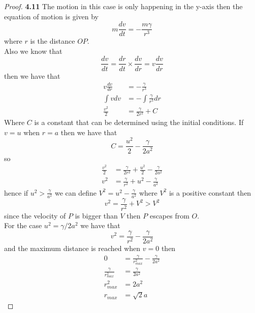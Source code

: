 \documentclass[11pt]{article}
\theoremstyle{definition}
\begin{document}
    \begin{proof}{\textbf{4.11}}
        The motion in this case is only happening in the y-axis then the
        equation of motion is given by 
        $$m \frac{dv}{dt} = -\frac{m\gamma}{r^3}$$
        where $r$ is the distance $OP$.\\
        Also we know that
        $$\frac{dv}{dt} = \frac{dr}{dt}\times\frac{dv}{dr} = v\frac{dv}{dr}$$
        then we have that
        \begin{align*}
            v\frac{dv}{dr} &= -\frac{\gamma}{r^3}\\
            \int vdv &= -\int \frac{\gamma}{r^3}dr\\
            \frac{v^2}{2} &= \frac{\gamma}{2r^2} + C
        \end{align*}
        Where $C$ is a constant that can be determined using the initial
        conditions. If $v = u$ when $r = a$ then we have
        that 
        $$C = \frac{u^2}{2} - \frac{\gamma}{2a^2}$$
        so
        \begin{align*}
            \frac{v^2}{2} &= \frac{\gamma}{2r^2} + \frac{u^2}{2} - \frac{\gamma}{2a^2}\\
            v^2 &= \frac{\gamma}{r^2} + u^2 - \frac{\gamma}{a^2}
        \end{align*}
        hence if $u^2 > \frac{\gamma}{a^2}$ we can define
        $V^2 = u^2 - \frac{\gamma}{a^2}$ where $V^2$ is a positive constant
        then
        $$v^2 = \frac{\gamma}{r^2} + V^2 > V^2$$
        since the velocity of $P$ is bigger than $V$ then $P$ escapes from $O$.\\
        
        For the case $u^2 = \gamma/2a^2$ we have that
        $$v^2 = \frac{\gamma}{r^2} - \frac{\gamma}{2a^2}$$
        and the maximum distance is reached when $v=0$ then
        \begin{align*}
            0 &= \frac{\gamma}{r_{max}^2} - \frac{\gamma}{2a^2}\\
            \frac{\gamma}{r_{max}^2} &= \frac{\gamma}{2a^2}\\
            r_{max}^2 &= 2a^2\\
            r_{max} &= \sqrt{2}a
        \end{align*}


\end{proof}
\end{document}
